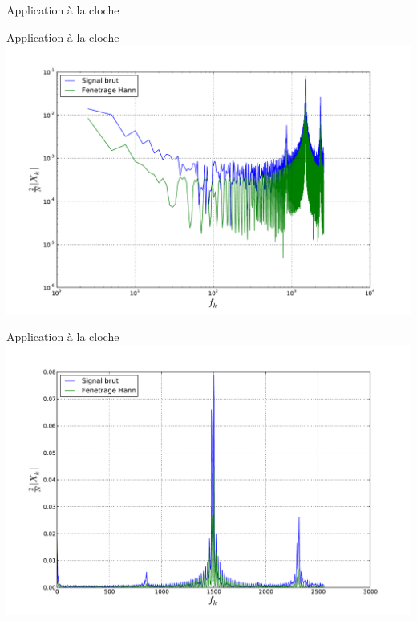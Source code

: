 \documentclass[8pt,a4paper]{beamer}
\begin{document}
\begin{frame}{Application à la cloche}

\end{frame}

\begin{frame}{Application à la cloche}
\includegraphics[width=1.\textwidth]{figures/FFT_cloche-log.pdf} \\
\end{frame}

\begin{frame}{Application à la cloche}
\includegraphics[width=1.\textwidth]{figures/FFT_cloche.pdf} \\
\end{frame}
\end{document}
